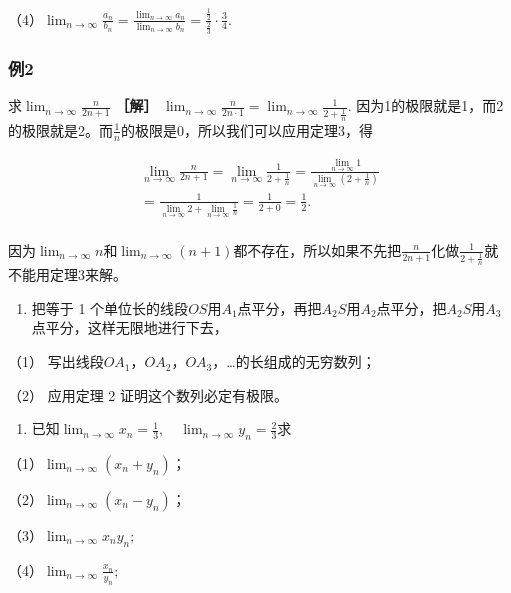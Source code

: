 （4）\(\lim_{n\to \infty}\frac{a_n}{b_n} = \frac{\lim_{n\to \infty}a_n}{\lim_{n\to \infty}b_n} = \frac{\frac{1}{2}}{\frac{2}{3}}\cdot \frac{3}{4}.\)

\subsubsection{例2}

求\(\lim_{n\to \infty}\frac{n}{2n + 1}\) \textbf{［解］}
\(\lim_{n\to \infty}\frac{n}{2n\cdot 1} = \lim_{n\to \infty}\frac{1}{2 + \frac{1}{n}}.\)
因为1的极限就是1，而2的极限就是2。而\(\frac{1}{n}\)的极限是0，所以我们可以应用定理3，得

\[
\begin{array}{l} \lim_{n \rightarrow \infty} \frac{n}{2 n + 1} = \lim_{n \rightarrow \infty} \frac{1}{2 + \frac{1}{n}} = \frac{\lim_{n \rightarrow \infty} 1}{\lim_{n \rightarrow \infty} \left(2 + \frac{1}{n}\right)} \\ = \frac{1}{\lim_{n \rightarrow \infty} 2 + \lim_{n \rightarrow \infty} \frac{1}{n}} = \frac{1}{2 + 0} = \frac{1}{2}. \\ \end{array}
\]

因为\(\lim_{n\to \infty}n\)和\(\lim_{n\to \infty}(n + 1)\)都不存在，所以如果不先把\(\frac{n}{2n+1}\)化做\(\frac{1}{2+\frac{1}{n}}\)就不能用定理3来解。

\begin{enumerate}
\item
  把等于 1
  个单位长的线段\(OS\)用\(A_{1}\)点平分，再把\(A_{2}S\)用\(A_{2}\)点平分，把\(A_{2}S\)用\(A_{3}\)点平分，这样无限地进行下去，
\end{enumerate}

（1）
写出线段\(OA_{1}\)，\(OA_{2}\)，\(OA_{3}\)，\ldots 的长组成的无穷数列；

（2） 应用定理 2 证明这个数列必定有极限。

\begin{enumerate}[start=2]
\item
  已知\(\lim_{n\to \infty}x_n = \frac{1}{3},\quad \lim_{n\to \infty}y_n = \frac{2}{3}\)求
\end{enumerate}

（1）\(\lim_{n\to \infty}(x_n + y_n)\)；

（2）\(\lim_{n\to \infty}(x_n - y_n)\)；

（3）\(\lim_{n\to \infty}x_n y_n;\)

（4）\(\lim_{n\to \infty}\frac{x_n}{y_n};\)

